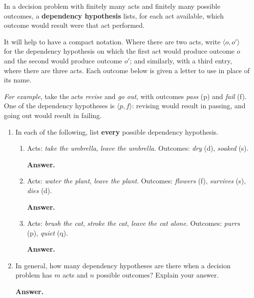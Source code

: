 \documentclass[11pt]{article}
\theoremstyle{definition}
\newenvironment{answer}
  {\par\medskip\noindent\textbf{Answer.}\par\nobreak\smallskip\ignorespaces}
  {\par\medskip}
\begin{document}
In a decision problem with finitely many acts and finitely many possible outcomes,
a \textbf{dependency hypothesis} lists, for each act available, which outcome
would result were that act performed.

It will help to have a compact notation. Where there are two acts, write
$\langle o, o' \rangle$ for the dependency hypothesis on which the first act would
produce outcome $o$ and the second would produce outcome $o'$; and similarly, with
a third entry, where there are three acts. Each outcome below is given a letter to
use in place of its name.

\emph{For example}, take the acts \emph{revise} and \emph{go out}, with outcomes
\emph{pass} (p) and \emph{fail} (f). One of the dependency hypotheses is
$\langle p, f \rangle$: revising would result in passing, and going out would
result in failing.

\begin{enumerate}[label=(\alph*)]

\item In each of the following, list \textbf{every} possible dependency
hypothesis.

\begin{enumerate}[label=(\roman*), itemsep=0.1em, topsep=0.25em, parsep=0pt]

\item Acts: \emph{take the umbrella}, \emph{leave the umbrella}.
Outcomes: \emph{dry} (d), \emph{soaked} (s).

\begin{answer}
\end{answer}

\item Acts: \emph{water the plant}, \emph{leave the plant}.
Outcomes: \emph{flowers} (f), \emph{survives} (s), \emph{dies} (d).

\begin{answer}
\end{answer}

\item Acts: \emph{brush the cat}, \emph{stroke the cat}, \emph{leave the cat
alone}. Outcomes: \emph{purrs} (p), \emph{quiet} (q).

\begin{answer}
\end{answer}

\end{enumerate}

\item In general, how many dependency hypotheses are there when a decision problem
has $m$ acts and $n$ possible outcomes? Explain your answer.

\begin{answer}
\end{answer}

\end{enumerate}
\end{document}
